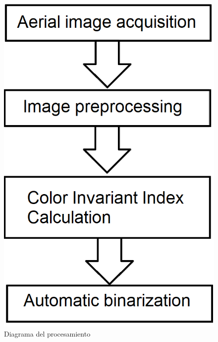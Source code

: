 \begin{figure}
    \includegraphics[width=\textwidth]{Imagenes/flowchart.png}
     \hfill
     \caption{Diagrama del procesamiento}
    \label{diagrama_procesamiento}
\end{figure}

